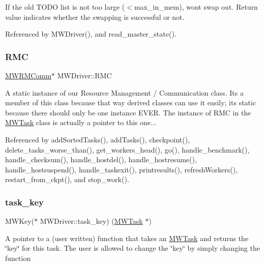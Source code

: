 If the old T\+O\+DO list is not too large ($<$max\+\_\+in\+\_\+mem), won\textquotesingle{}t swap out. Return value indicates whether the swapping is successful or not. 

Referenced by M\+W\+Driver(), and read\+\_\+master\+\_\+state().

\mbox{\label{classMWDriver_a3063439d04c8048868d6c4d5c51c6778}} 
\subsubsection{\texorpdfstring{R\+MC}{RMC}}
{\footnotesize\ttfamily \hyperlink{classMWRMComm}{M\+W\+R\+M\+Comm}$\ast$ M\+W\+Driver\+::\+R\+MC\hspace{0.3cm}{\ttfamily [static]}}

A static instance of our Resource Management / Communication class. It\textquotesingle{}s a member of this class because that way derived classes can use it easily; it\textquotesingle{}s static because there should only be one instance E\+V\+ER. The instance of R\+MC in the \hyperlink{classMWTask}{M\+W\+Task} class is actually a pointer to this one... 

Referenced by add\+Sorted\+Tasks(), add\+Tasks(), checkpoint(), delete\+\_\+tasks\+\_\+worse\+\_\+than(), get\+\_\+workers\+\_\+head(), go(), handle\+\_\+benchmark(), handle\+\_\+checksum(), handle\+\_\+hostdel(), handle\+\_\+hostresume(), handle\+\_\+hostsuspend(), handle\+\_\+taskexit(), printresults(), refresh\+Workers(), restart\+\_\+from\+\_\+ckpt(), and stop\+\_\+work().

\mbox{\label{classMWDriver_a1d359e2a84216713f63d93ff343c68b2}} 
\subsubsection{\texorpdfstring{task\+\_\+key}{task\_key}}
{\footnotesize\ttfamily M\+W\+Key($\ast$ M\+W\+Driver\+::task\+\_\+key) (\hyperlink{classMWTask}{M\+W\+Task} $\ast$)\hspace{0.3cm}{\ttfamily [protected]}}

A pointer to a (user written) function that takes an \hyperlink{classMWTask}{M\+W\+Task} and returns the \char`\"{}key\char`\"{} for this task. The user is allowed to change the \char`\"{}key\char`\"{} by simply changing the function 

